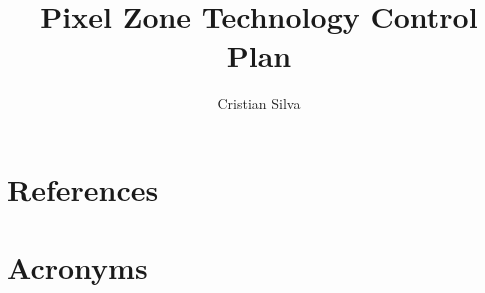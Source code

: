 \documentclass[PMO,authoryear,toc]{lsstdoc}
\title{Pixel Zone Technology Control Plan}
\author{%
Cristian Silva
}
\date{\vcsDate}
\begin{document}
\maketitle


\appendix
\section{References} \label{sec:bib}
\renewcommand{\refname}{} %


\section{Acronyms} \label{sec:acronyms}

\end{document}
